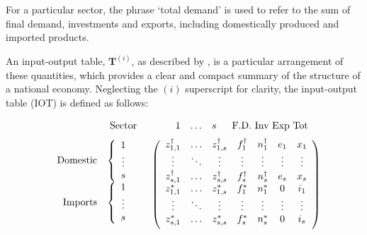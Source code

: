 \documentclass[a4paper]{article}
\begin{document}
For a particular sector, the phrase `total demand' is used to refer to the sum of final demand, investments and exports, including domestically produced and imported products.

An input-output table, $\boldsymbol{T}^{(i)}$, as described by \textcite{miller_input-output_1985}, is a particular arrangement of these quantities, which provides a clear and compact summary of the structure of a national economy.
Neglecting the $(i)$ superscript for clarity, the input-output table (IOT) is defined as follows:

\begin{equation}\label{eqn:T}
\begin{array}{rc}
\begin{array}{cc} & \mbox{Sector} \end{array} 
& 
\begin{array}{cccc} \hspace*{4mm}1 & \mathellipsis & s & \hspace*{2mm} \mbox{F.D. Inv Exp Tot} \end{array} \vspace*{2mm} \\
\begin{array}{r}
\begin{array}{rc}
\mbox{Domestic} & \left\{ \begin{array}{c}
1 \\
\vdots \\
s
\end{array} \right. \\
\mbox{Imports} & \left\{ \begin{array}{c}
1 \\
\vdots \\
s \\
\end{array} \right.
\end{array} \vspace*{2mm} \\
\end{array} &
\left( \begin{array}{ccccccc}
z^{\dag}_{1,1} & \mathellipsis & z^{\dag}_{1,s} & f^\dag_{1} & n^\dag_{1} & e_{1} & x_1 \\
\vdots & \ddots & \vdots & \vdots & \vdots & \vdots & \vdots \\
z^{\dag}_{s,1} & \mathellipsis & z^{\dag}_{s,s} & f^\dag_{s} & n^\dag_{s} & e_{s} & x_{s} \\
z^*_{1,1} & \mathellipsis & z^*_{1,s} & f^*_{1} & n^*_{1} & 0 & i_1 \\
\vdots & \ddots & \vdots & \vdots & \vdots & \vdots & \vdots \\
z^*_{s,1} & \mathellipsis & z^*_{s,s} & f^*_{s} & n^*_{s} & 0 & i_{s} \vspace*{2mm} \\
\end{array} \right)
\end{array}
\end{equation}
\end{document}
